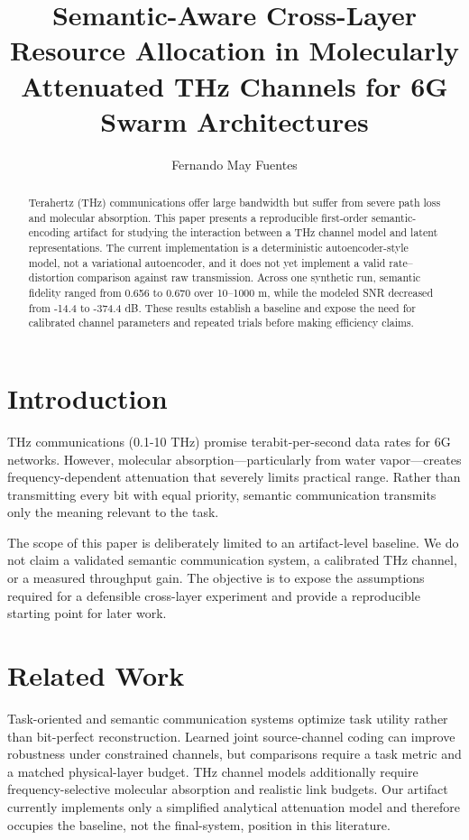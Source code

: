 \documentclass[sigconf]{acmart}
\title{Semantic-Aware Cross-Layer Resource Allocation in Molecularly Attenuated THz Channels for 6G Swarm Architectures}
\author{Fernando May Fuentes}
\affiliation{
  \institution{Instituto Polit\'{e}cnico Nacional}
  \city{Ciudad de M\'{e}xico}
  \country{M\'{e}xico}
}
\begin{document}
\begin{abstract}
Terahertz (THz) communications offer large bandwidth but suffer from severe path loss and molecular absorption. This paper presents a reproducible first-order semantic-encoding artifact for studying the interaction between a THz channel model and latent representations. The current implementation is a deterministic autoencoder-style model, not a variational autoencoder, and it does not yet implement a valid rate--distortion comparison against raw transmission. Across one synthetic run, semantic fidelity ranged from 0.656 to 0.670 over 10--1000 m, while the modeled SNR decreased from -14.4 to -374.4 dB. These results establish a baseline and expose the need for calibrated channel parameters and repeated trials before making efficiency claims.
\end{abstract}


\maketitle

\section{Introduction}

THz communications (0.1-10 THz) promise terabit-per-second data rates for 6G networks. However, molecular absorption---particularly from water vapor---creates frequency-dependent attenuation that severely limits practical range. Rather than transmitting every bit with equal priority, semantic communication transmits only the meaning relevant to the task.

The scope of this paper is deliberately limited to an artifact-level baseline. We do not claim a validated semantic communication system, a calibrated THz channel, or a measured throughput gain. The objective is to expose the assumptions required for a defensible cross-layer experiment and provide a reproducible starting point for later work.

\section{Related Work}

Task-oriented and semantic communication systems optimize task utility rather than bit-perfect reconstruction. Learned joint source-channel coding can improve robustness under constrained channels, but comparisons require a task metric and a matched physical-layer budget. THz channel models additionally require frequency-selective molecular absorption and realistic link budgets. Our artifact currently implements only a simplified analytical attenuation model and therefore occupies the baseline, not the final-system, position in this literature.
\end{document}

